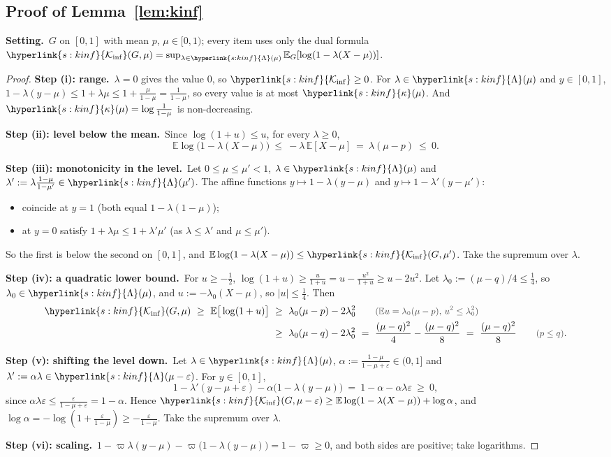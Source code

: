 \documentclass[10pt]{article}
\newcommand{\sy}[2]{{\hyperlink{#1}{#2}}}
\newcommand{\E}{\mathbb{E}}
\newcommand{\1}{\mathbf{1}}
\newcommand{\Ki}{\sy{s:kinf}{\mathcal K_{\inf}}}
\newcommand{\kap}{\sy{s:kinf}{\kappa}}
\newcommand{\Lset}[1]{\sy{s:kinf}{\Lambda}(#1)}
\newcommand{\Setting}{\noindent\textbf{Setting.}\ }
\newcommand{\stp}[2]{\par\medskip\noindent\textbf{Step #1: #2.}\ }
\newcommand{\why}[1]{\text{\small\color{black!70}(#1)}}
\begin{document}
\subsection{Proof of Lemma~\ref{lem:kinf}}\label{sec:pf-lem:kinf}
\begin{setgoal}
\Setting $G$ on $[0,1]$ with mean $p$, $\mu\in[0,1)$; every item uses only the dual formula $\Ki(G,\mu)=\sup_{\lambda\in\Lset{\mu}}\E_G[\log(1-\lambda(X-\mu))]$.
\end{setgoal}
\begin{proof}
\stp{(i)}{range}$\lambda=0$ gives the value $0$, so $\Ki\ge0$. For $\lambda\in\Lset{\mu}$ and $y\in[0,1]$, $1-\lambda(y-\mu)\le1+\lambda\mu\le1+\frac\mu{1-\mu}=\frac1{1-\mu}$, so every
value is at most $\kap(\mu)$. And $\kap(\mu)=\log\frac1{1-\mu}$ is non-decreasing.

\stp{(ii)}{level below the mean}Since $\log(1+u)\le u$, for every $\lambda\ge0$,
\[
\E\log\big(1-\lambda(X-\mu)\big)\ \le\ -\lambda\,\E[X-\mu]\ =\ \lambda(\mu-p)\ \le\ 0 .
\]

\stp{(iii)}{monotonicity in the level}Let $0\le\mu\le\mu'<1$, $\lambda\in\Lset{\mu}$ and $\lambda':=\lambda\frac{1-\mu}{1-\mu'}\in\Lset{\mu'}$. The affine functions $y\mapsto1-\lambda(y-\mu)$
and $y\mapsto1-\lambda'(y-\mu')$:
\begin{itemize}
\item coincide at $y=1$ (both equal $1-\lambda(1-\mu)$);
\item at $y=0$ satisfy $1+\lambda\mu\le1+\lambda'\mu'$ (as $\lambda\le\lambda'$ and $\mu\le\mu'$).
\end{itemize}
So the first is below the second on $[0,1]$, and $\E\log(1-\lambda(X-\mu))\le\Ki(G,\mu')$. Take the supremum over $\lambda$.

\stp{(iv)}{a quadratic lower bound}For $u\ge-\frac12$, $\log(1+u)\ge\frac u{1+u}=u-\frac{u^2}{1+u}\ge u-2u^2$. Let $\lambda_0:=(\mu-q)/4\le\frac14$, so $\lambda_0\in\Lset{\mu}$, and
$u:=-\lambda_0(X-\mu)$, so $|u|\le\frac14$. Then
\begin{align*}
\Ki(G,\mu)\ \ge\ \E\big[\log(1+u)\big]\ &\ge\ \lambda_0(\mu-p)-2\lambda_0^2\qquad\why{$\E u=\lambda_0(\mu-p)$, $u^2\le\lambda_0^2$}\\
&\ge\ \lambda_0(\mu-q)-2\lambda_0^2\ =\ \frac{(\mu-q)^2}4-\frac{(\mu-q)^2}8\ =\ \frac{(\mu-q)^2}8\qquad\why{$p\le q$}.
\end{align*}

\stp{(v)}{shifting the level down}Let $\lambda\in\Lset{\mu}$, $\alpha:=\frac{1-\mu}{1-\mu+\varepsilon}\in(0,1]$ and $\lambda':=\alpha\lambda\in\Lset{\mu-\varepsilon}$. For $y\in[0,1]$,
\[
1-\lambda'(y-\mu+\varepsilon)-\alpha\big(1-\lambda(y-\mu)\big)\ =\ 1-\alpha-\alpha\lambda\varepsilon\ \ge\ 0,
\]
since $\alpha\lambda\varepsilon\le\frac\varepsilon{1-\mu+\varepsilon}=1-\alpha$. Hence $\Ki(G,\mu-\varepsilon)\ge\E\log(1-\lambda(X-\mu))+\log\alpha$, and
$\log\alpha=-\log(1+\frac\varepsilon{1-\mu})\ge-\frac\varepsilon{1-\mu}$. Take the supremum over $\lambda$.

\stp{(vi)}{scaling}$1-\varpi\lambda(y-\mu)-\varpi\big(1-\lambda(y-\mu)\big)=1-\varpi\ge0$, and both sides are positive; take logarithms.
\end{proof}
\end{document}
